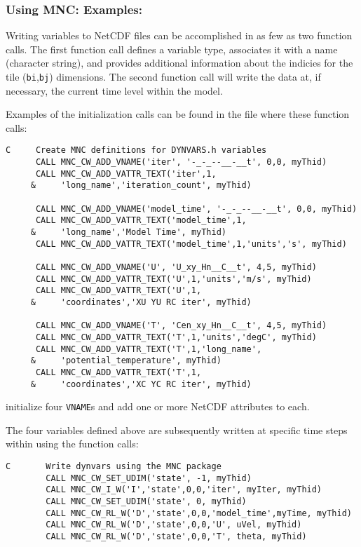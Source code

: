 \subsubsection{Using MNC: Examples:}

Writing variables to NetCDF files can be accomplished in as few as two
function calls.  The first function call defines a variable type,
associates it with a name (character string), and provides additional
information about the indicies for the tile (\texttt{bi},\texttt{bj})
dimensions.  The second function call will write the data at, if
necessary, the current time level within the model.

Examples of the initialization calls can be found in the file 
where these function calls:
{\footnotesize
\begin{verbatim}
C     Create MNC definitions for DYNVARS.h variables
      CALL MNC_CW_ADD_VNAME('iter', '-_-_--__-__t', 0,0, myThid)
      CALL MNC_CW_ADD_VATTR_TEXT('iter',1,
     &     'long_name','iteration_count', myThid)

      CALL MNC_CW_ADD_VNAME('model_time', '-_-_--__-__t', 0,0, myThid)
      CALL MNC_CW_ADD_VATTR_TEXT('model_time',1,
     &     'long_name','Model Time', myThid)
      CALL MNC_CW_ADD_VATTR_TEXT('model_time',1,'units','s', myThid)

      CALL MNC_CW_ADD_VNAME('U', 'U_xy_Hn__C__t', 4,5, myThid)
      CALL MNC_CW_ADD_VATTR_TEXT('U',1,'units','m/s', myThid)
      CALL MNC_CW_ADD_VATTR_TEXT('U',1,
     &     'coordinates','XU YU RC iter', myThid)

      CALL MNC_CW_ADD_VNAME('T', 'Cen_xy_Hn__C__t', 4,5, myThid)
      CALL MNC_CW_ADD_VATTR_TEXT('T',1,'units','degC', myThid)
      CALL MNC_CW_ADD_VATTR_TEXT('T',1,'long_name',
     &     'potential_temperature', myThid)
      CALL MNC_CW_ADD_VATTR_TEXT('T',1,
     &     'coordinates','XC YC RC iter', myThid)
\end{verbatim}
}
{\noindent initialize four \texttt{VNAME}s and add one or more NetCDF
  attributes to each.}
    
The four variables defined above are subsequently written at specific
time steps within
using the function calls:
{\footnotesize
\begin{verbatim}
C       Write dynvars using the MNC package
        CALL MNC_CW_SET_UDIM('state', -1, myThid)
        CALL MNC_CW_I_W('I','state',0,0,'iter', myIter, myThid)
        CALL MNC_CW_SET_UDIM('state', 0, myThid)
        CALL MNC_CW_RL_W('D','state',0,0,'model_time',myTime, myThid)
        CALL MNC_CW_RL_W('D','state',0,0,'U', uVel, myThid)
        CALL MNC_CW_RL_W('D','state',0,0,'T', theta, myThid)
\end{verbatim}
}

